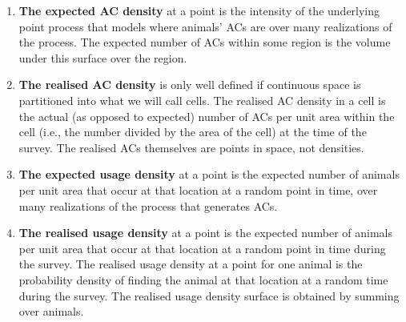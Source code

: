 \documentclass[10pt,a4paper]{article}
\begin{document}
\begin{enumerate}
\item \textbf{The expected AC density} at a point is the intensity of the underlying point process that models where animals' ACs are over many realizations of the process. %
The expected number of ACs within some region is the volume under this surface over the region.
\item \textbf{The realised AC density} is only well defined if continuous space is partitioned into what we will call cells. The realised AC density in a cell is the actual (as opposed to expected) number of ACs per unit area within the cell (i.e., the number divided by the area of the cell) at the time of the survey. The realised ACs themselves are points in space, not densities.
\item \textbf{The expected usage density} at a point is the expected number of animals per unit area that occur at that location at a random point in time, over many realizations of the process that generates ACs.
\item \textbf{The realised usage density} at a point is the expected number of animals per unit area that occur at that location at a random point in time during the survey. The realised usage density at a point for one animal is the probability density of finding the animal at that location at a random time during the survey. The realised usage density surface is obtained by summing over animals.
\end{enumerate}
\end{document}
